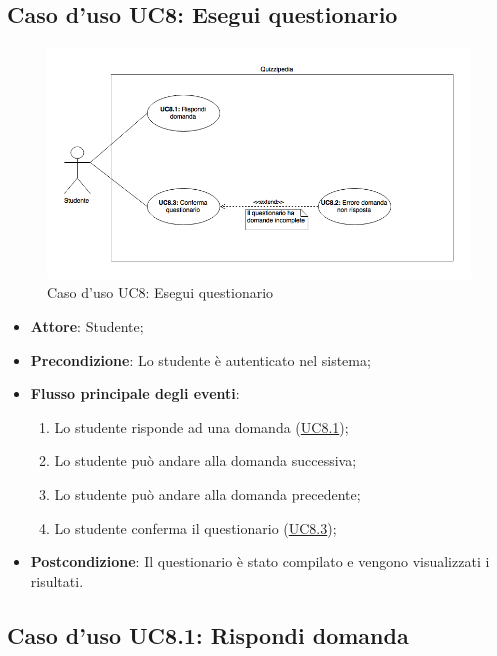 \documentclass[12pt,a4paper]{article}
\begin{document}
\subsection{Caso d'uso UC8: Esegui questionario}
\begin{figure}[H]
	\centering
	\includegraphics[width=\textwidth]{../img/diagramUC8.png}
	\caption{Caso d'uso UC8: Esegui questionario}\label{fig:UC8} 
\end{figure}
\begin{itemize}

\item \textbf{Attore}: Studente; 
\item \textbf{Precondizione}: Lo studente è autenticato nel sistema;

\item \textbf{Flusso principale degli eventi}:
\begin{enumerate}
	\item Lo studente risponde ad una domanda (\hyperlink{UC8.1}{UC8.1});
	\item Lo studente può andare alla domanda successiva;
	\item Lo studente può andare alla domanda precedente;
	\item Lo studente conferma il questionario (\hyperlink{UC8.3}{UC8.3});
	
\end{enumerate}
\item \textbf{Postcondizione}: Il questionario è stato compilato e vengono visualizzati i risultati.
\end{itemize}
\hypertarget{UC8.1}{}
\subsection{Caso d'uso UC8.1: Rispondi domanda}
\end{document}
